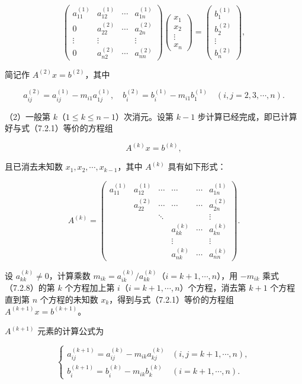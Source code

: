 \documentclass[
  10pt,
  fontset=fandol]{ctexart}
\begin{document}
\[
\begin{pmatrix}
a_{11}^{(1)}&a_{12}^{(1)}&\cdots&a_{1n}^{(1)}\\
0&a_{22}^{(2)}&\cdots&a_{2n}^{(2)}\\
\vdots&\vdots&&\vdots\\
0&a_{n2}^{(2)}&\cdots&a_{nn}^{(2)}
\end{pmatrix}
\begin{pmatrix}x_1\\x_2\\\vdots\\x_n\end{pmatrix}
=\begin{pmatrix}b_1^{(1)}\\b_2^{(2)}\\\vdots\\b_n^{(2)}\end{pmatrix},
\tag{7.2.7}
\]

简记作 \(A^{(2)}x=b^{(2)}\)，其中

\[
a_{ij}^{(2)}=a_{ij}^{(1)}-m_{i1}a_{1j}^{(1)},\quad
b_i^{(2)}=b_i^{(1)}-m_{i1}b_1^{(1)}\quad(i,j=2,3,\cdots,n).
\]

（2）一般第 \(k\)（\(1\le k\le n-1\)）次消元。设第 \(k-1\) 步计算已经完成，即已计算好与式（7.2.1）等价的方程组

\[A^{(k)}x=b^{(k)},\tag{7.2.8}\]

且已消去未知数 \(x_1,x_2,\cdots,x_{k-1}\)，其中 \(A^{(k)}\) 具有如下形式：

\[
A^{(k)}=\begin{pmatrix}
a_{11}^{(1)}&a_{12}^{(1)}&\cdots&\cdots&\cdots&a_{1n}^{(1)}\\
&a_{22}^{(2)}&\cdots&\cdots&\cdots&a_{2n}^{(2)}\\
&&\ddots&&&\vdots\\
&&&a_{kk}^{(k)}&\cdots&a_{kn}^{(k)}\\
&&&\vdots&&\vdots\\
&&&a_{nk}^{(k)}&\cdots&a_{nn}^{(k)}
\end{pmatrix}.
\]

设 \(a_{kk}^{(k)}\ne0\)，计算乘数 \(m_{ik}=a_{ik}^{(k)}/a_{kk}^{(k)}\)（\(i=k+1,\cdots,n\)），用 \(-m_{ik}\) 乘式（7.2.8）的第 \(k\) 个方程加上第 \(i\)（\(i=k+1,\cdots,n\)）个方程，消去第 \(k+1\) 个方程直到第 \(n\) 个方程的未知数 \(x_k\)，得到与式（7.2.1）等价的方程组 \(A^{(k+1)}x=b^{(k+1)}\)。

\(A^{(k+1)}\) 元素的计算公式为

\[
\begin{cases}
a_{ij}^{(k+1)}=a_{ij}^{(k)}-m_{ik}a_{kj}^{(k)}& (i,j=k+1,\cdots,n),\\
b_i^{(k+1)}=b_i^{(k)}-m_{ik}b_k^{(k)}& (i=k+1,\cdots,n).
\end{cases}
\tag{7.2.9}
\]
\end{document}
